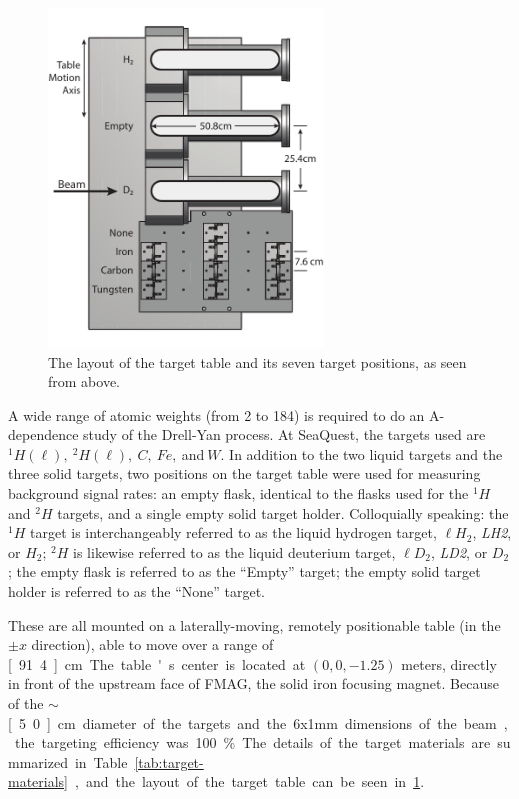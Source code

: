 \begin{figure}[p]
	\begin{center}
		\includegraphics[width=0.65\textwidth]{figures/apparatus/target-tableLayout.pdf}
		\caption{The layout of the target table and its seven target positions, as seen from above.}
		\label{fig:table-layout}
	\end{center}
\end{figure}


A wide range of atomic weights (from 2 to 184) is required to do an A-dependence study of the Drell-Yan process. At SeaQuest, the targets used are $^1H (\ell),\ ^2H (\ell),\ C,\ Fe,\ $and$\ W$. In addition to the two liquid targets and the three solid targets, two positions on the target table were used for measuring background signal rates: an empty flask, identical to the flasks used for the $^1H$ and $^2H$ targets, and a single empty solid target holder. Colloquially speaking: the $^1H$ target is interchangeably referred to as the liquid hydrogen target, $\ell H_2$, \emph{LH2}, or $H_2$; $^2H$ is likewise referred to as the liquid deuterium target, $\ell D_2$, \emph{LD2}, or $D_2$; the empty flask is referred to as the ``Empty'' target; the empty solid target holder is referred to as the ``None'' target.

These are all mounted on a laterally-moving, remotely positionable table (in the $\pm x$ direction), able to move over a range of \unit[91.4]{cm}. The table's center is located at $(0, 0, -1.25)$ meters, directly in front of the upstream face of FMAG, the solid iron focusing magnet. Because of the $\sim$\unit[5.0]{cm} diameter of the targets and the 6x1mm dimensions of the beam, the targeting efficiency was 100\%. The details of the target materials are summarized in Table \ref{tab:target-materials}, and the layout of the target table can be seen in \ref{fig:table-layout}.

